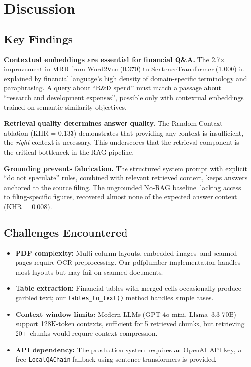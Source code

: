 \documentclass[12pt,a4paper]{article}
\begin{document}
\section{Discussion}

\subsection{Key Findings}

\textbf{Contextual embeddings are essential for financial Q\&A.}
The 2.7$\times$ improvement in MRR from Word2Vec (0.370) to SentenceTransformer (1.000) is explained by financial language's high density of domain-specific terminology and paraphrasing. A query about ``R\&D spend'' must match a passage about ``research and development expenses'', possible only with contextual embeddings trained on semantic similarity objectives.

\textbf{Retrieval quality determines answer quality.}
The Random Context ablation (KHR = 0.133) demonstrates that providing any context is insufficient, the \textit{right} context is necessary. This underscores that the retrieval component is the critical bottleneck in the RAG pipeline.

\textbf{Grounding prevents fabrication.}
The structured system prompt with explicit ``do not speculate'' rules, combined with relevant retrieved context, keeps answers anchored to the source filing. The ungrounded No-RAG baseline, lacking access to filing-specific figures, recovered almost none of the expected answer content (KHR = 0.008).

\subsection{Challenges Encountered}

\begin{itemize}[leftmargin=*, noitemsep]
  \item \textbf{PDF complexity:} Multi-column layouts, embedded images, and scanned pages require OCR preprocessing. Our pdfplumber implementation handles most layouts but may fail on scanned documents.
  \item \textbf{Table extraction:} Financial tables with merged cells occasionally produce garbled text; our \texttt{tables\_to\_text()} method handles simple cases.
  \item \textbf{Context window limits:} Modern LLMs (GPT-4o-mini, Llama~3.3 70B) support 128K-token contexts, sufficient for 5 retrieved chunks, but retrieving 20+ chunks would require context compression.
  \item \textbf{API dependency:} The production system requires an OpenAI API key; a free \texttt{LocalQAChain} fallback using sentence-transformers is provided.
\end{itemize}
\end{document}
